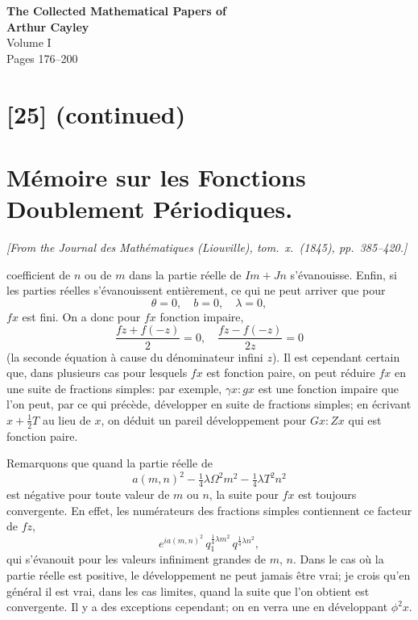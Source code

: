 \documentclass[12pt,a4paper]{article}
\begin{document}

\begin{center}
{\LARGE\bfseries The Collected Mathematical Papers of}\\[0.5em]
{\LARGE\bfseries Arthur Cayley}\\[1em]
{\Large Volume I}\\[1em]
{\large Pages 176--200}\\[2em]
\end{center}

\tableofcontents
\newpage

\section*{[25] (continued)}
\section*{M\'emoire sur les Fonctions Doublement P\'eriodiques.}

\textit{[From the Journal des Math\'ematiques (Liouville), tom.~x.~(1845), pp.~385--420.]}

\bigskip
\setcounter{page}{176}

coefficient de $n$ ou de $m$ dans la partie r\'eelle de $Im + Jn$ s'\'evanouisse. Enfin, si les parties r\'eelles s'\'evanouissent enti\`erement, ce qui ne peut arriver que pour
\[
\theta = 0,\quad b = 0,\quad \lambda = 0,
\]
$fx$ est fini. On a donc pour $fx$ fonction impaire,
\[
\frac{fz + f(-z)}{2} = 0,\quad \frac{fz - f(-z)}{2z} = 0
\]
(la seconde \'equation \`a cause du d\'enominateur infini $z$). Il est cependant certain que, dans plusieurs cas pour lesquels $fx$ est fonction paire, on peut r\'eduire $fx$ en une suite de fractions simples: par exemple, $\gamma x : gx$ est une fonction impaire que l'on peut, par ce qui pr\'ec\`ede, d\'evelopper en suite de fractions simples; en \'ecrivant $x + \tfrac{1}{2}T$ au lieu de $x$, on d\'eduit un pareil d\'eveloppement pour $Gx : Zx$ qui est fonction paire.

Remarquons que quand la partie r\'eelle de
\[
a(m,n)^2 - \tfrac{1}{4}\lambda\Omega^2 m^2 - \tfrac{1}{4}\lambda T^2 n^2
\]
est n\'egative pour toute valeur de $m$ ou $n$, la suite pour $fx$ est toujours convergente. En effet, les num\'erateurs des fractions simples contiennent ce facteur de $fz$,
\[
e^{ia(m,n)^2}\, q_1^{\tfrac14\lambda m^2}\, q^{\tfrac14\lambda n^2},
\]
qui s'\'evanouit pour les valeurs infiniment grandes de $m$, $n$. Dans le cas o\`u la partie r\'eelle est positive, le d\'eveloppement ne peut jamais \^etre vrai; je crois qu'en g\'en\'eral il est vrai, dans les cas limites, quand la suite que l'on obtient est convergente. Il y a des exceptions cependant; on en verra une en d\'eveloppant $\phi^2 x$.
\end{document}
